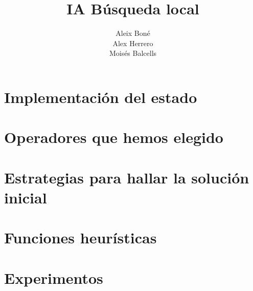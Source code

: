 

\title{IA Búsqueda local}
\author{%
    Aleix Boné\\
    Alex Herrero\\
    Moisés Balcells\\
}
\date{%
}


 
    \maketitle
    
    
    
    \section{Implementación del estado}
    
    \section{Operadores que hemos elegido}
    
    \section{Estrategias para hallar la solución inicial}
    
    \section{Funciones heurísticas}
    
    \section{Experimentos}
    
